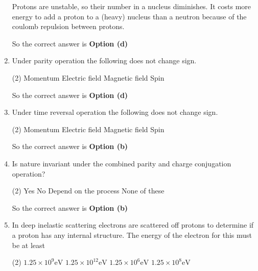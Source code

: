 \begin{enumerate}
\begin{tasks}
		\task[\textbf{c.}] Protons are unstable, so their number in a nucleus diminishes.
		\task[\textbf{d.}]  It costs more energy to add a proton to a (heavy) nucleus than a neutron because of the coulomb repulsion between protons.
	\end{tasks}
\begin{answer}
So the correct answer is \textbf{Option (d)}
\end{answer}
	\item Under parity operation the following does not change sign.
	 \begin{tasks}(2)
		\task[\textbf{a.}]Momentum
		\task[\textbf{b.}] Electric field
		\task[\textbf{c.}] Magnetic field
		\task[\textbf{d.}]  Spin
	\end{tasks}
\begin{answer}
	So the correct answer is \textbf{Option (d)}
\end{answer}
	\item Under time reversal operation the following does not change sign.
	 \begin{tasks}(2)
		\task[\textbf{a.}]Momentum
		\task[\textbf{b.}] Electric field
		\task[\textbf{c.}] Magnetic field
		\task[\textbf{d.}] Spin
	\end{tasks}
\begin{answer}
	So the correct answer is \textbf{Option (b)}
\end{answer}
	\item Is nature invariant under the combined parity and charge conjugation operation?
	 \begin{tasks}(2)
		\task[\textbf{a.}]Yes
		\task[\textbf{b.}]No
		\task[\textbf{c.}]Depend on the process
		\task[\textbf{d.}] None of these
	\end{tasks}
\begin{answer}
	So the correct answer is \textbf{Option (b)}
\end{answer}
	\item In deep inelastic scattering electrons are scattered off protons to determine if a proton has any internal structure. The energy of the electron for this must be at least
	 \begin{tasks}(2)
		\task[\textbf{a.}] $1.25 \times 10^9 \mathrm{eV}$
		\task[\textbf{b.}]$1.25 \times 10^{12} \mathrm{eV}$
		\task[\textbf{c.}]$1.25 \times 10^6 \mathrm{eV}$
		\task[\textbf{d.}]  $1.25 \times 10^8 \mathrm{eV}$
	\end{tasks}
\begin{answer}
	$$
	\begin{aligned}

\end{aligned}$$
\end{answer}
\end{enumerate}
